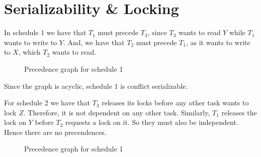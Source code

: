 
\section{Serializability \& Locking}

\begin{multicols}{2}
    In schedule 1 we have that $T_1$ must precede $T_3$, since $T_3$ wants to
    read $Y$ while $T_1$ wants to write to $Y$. And, we have that $T_2$ must
    precede $T_1$, as it wants to write to $X$, which $T_2$ wants to read.
    \begin{figure}[H]
        \centering
        \caption{Precedence graph for schedule 1}
        \label{fig:trans-schedule-1}
    \end{figure}
    Since the graph is acyclic, schedule 1 is conflict serializable.

    \colbreak

    For schedule 2 we have that $T_3$ releases its locks before any other task
    wants to lock $Z$. Therefore, it is not dependent on any other task.
    Similarly, $T_1$ releases the lock on $Y$ before $T_2$ requests a lock on
    it. So they must also be independent. Hence there are no precendences.
    \begin{figure}[H]
        \centering
        \caption{Precedence graph for schedule 1}
        \label{fig:trans-schedule-1}
    \end{figure}

\end{multicols}
